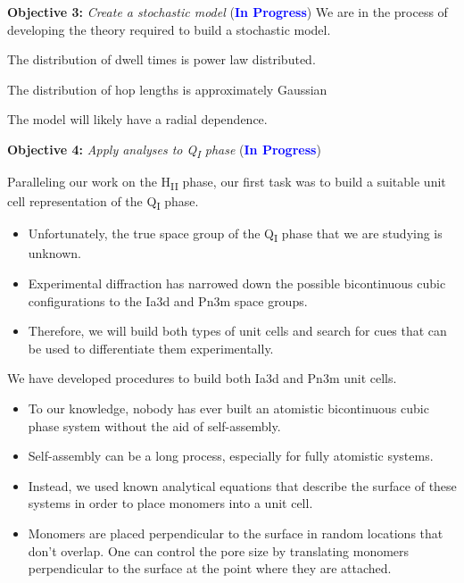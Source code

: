 \documentclass{article}
\begin{document}
  \noindent \textbf{\large Objective 3:} \textit{\large Create a stochastic model} (\textcolor{blue}{\textbf{In Progress}})
  \noindent We are in the process of developing the theory required to build a 
  stochastic model. 
  
  \noindent The distribution of dwell times is power law distributed.
  
  \noindent The distribution of hop lengths is approximately Gaussian
  
  \noindent The model will likely have a radial dependence. 
  
  \noindent \textbf{\large Objective 4:} \textit{\large Apply analyses to Q\textsubscript{I} phase} (\textcolor{blue}{\textbf{In Progress}})
  
  Paralleling our work on the H\textsubscript{II} phase, our first task was to
  build a suitable unit cell representation of the Q\textsubscript{I} phase. 
  \begin{itemize}
    \item Unfortunately, the true space group of the Q\textsubscript{I}
    phase that we are studying is unknown. 
    \item Experimental diffraction has narrowed down the possible bicontinuous
    cubic configurations to the Ia3d and Pn3m space groups. 
    \item Therefore, we will build both types of unit cells and search for
    cues that can be used to differentiate them experimentally.
  \end{itemize}  
  
  \noindent We have developed procedures to build both Ia3d and Pn3m unit
  cells.
  \begin{itemize}
    \item To our knowledge, nobody has ever built an atomistic bicontinuous
    cubic phase system without the aid of self-assembly.
    \item Self-assembly can be a long process, especially for fully atomistic
    systems. 
    \item Instead, we used known analytical equations that describe the 
    surface of these systems in order to place monomers into a unit cell.
    \item Monomers are placed perpendicular to the surface in random locations
    that don't overlap. One can control the pore size by translating monomers 
    perpendicular to the surface at the point where they are attached.
  \end{itemize}
  
\end{document}
